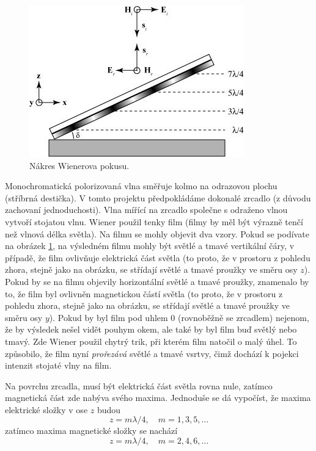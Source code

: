 \documentclass[12pt,a4paper,titlepage,final]{report}
\begin{document}
\begin{figure}[!htb]
   \centering
 	\includegraphics{energy_fig_wiener}
   \caption{Nákres Wienerova pokusu.}
   \label{fig:energy_fig_wiener}
\end{figure}

Monochromatická polorizovaná vlna směřuje kolmo na odrazovou plochu (stříbrná destička). V tomto
projektu předpokládáme dokonalé zrcadlo (z důvodu zachovaní jednoduchosti). Vlna mířící na zrcadlo společne s odraženo vlnou
vytvoří stojatou vlnu. Wiener použil tenky film (filmy by měl být výrazně tenčí než vlnová délka světla). 
Na filmu se mohly objevit dva vzory. Pokud se podívate na obrázek \ref{fig:energy_fig_wiener}, na výsledném filmu mohly být světlé a tmavé vertikální čáry, v případě, že film ovlivňuje elektrická část světla (to proto, že v prostoru z pohledu zhora, stejně jako na obrázku, se střídají světlé a tmavé proužky ve směru osy $z$). Pokud by se na filmu objevily 
horizontální světlé a tmavé proužky, znamenalo by to, že film byl ovlivněn magnetickou částí světla (to proto, že v prostoru z pohledu zhora, stejně jako na obrázku, se střídají světlé a tmavé proužky ve směru osy $y$). Pokud by byl film pod uhlem 0 (rovnoběžně se zrcadlem) nejenom, že by výsledek nešel vidět pouhym okem, ale také by byl film buď světlý nebo tmavý. Zde Wiener použil chytrý trik, při kterém film natočil o malý úhel. To způsobilo, že film nyní \emph{prořezává} světlé a tmavé vsrtvy, čimž dochází k pojekci intenzit stojaté vlny na film.

Na povrchu zrcadla, musí být elektrická část světla rovna nule, zatímco magnetická část zde nabýva svého maxima. Jednoduše se dá 
vypočíst, že maxima elektrické složky v ose $z$ budou
\begin{equation}
z = m\lambda / 4, \quad m=1,3,5,\ldots
\end{equation}
zatímco maxima magnetické složky se nachází
\begin{equation}
z = m\lambda / 4, \quad m=2,4,6,\ldots
\end{equation}
\end{document}
